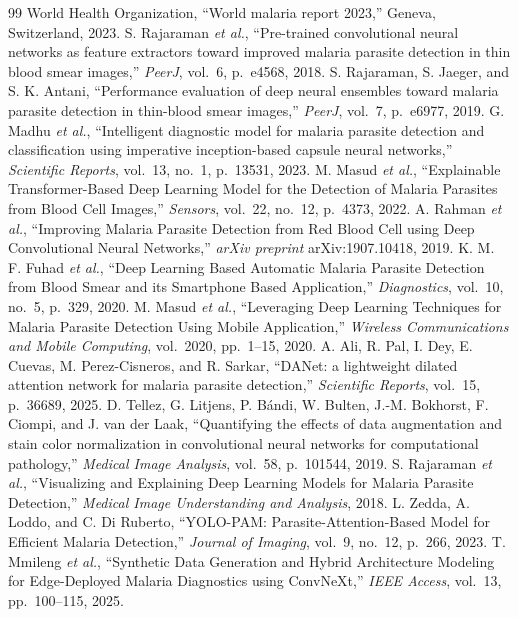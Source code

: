 \documentclass[conference]{IEEEtran}
\begin{document}
\begin{thebibliography}{99}
 World Health Organization, ``World malaria report 2023,'' Geneva,
Switzerland, 2023.
 S. Rajaraman \emph{et al.}, ``Pre-trained convolutional
neural networks as feature extractors toward improved malaria parasite detection in
thin blood smear images,'' \emph{PeerJ}, vol.~6, p.~e4568, 2018.
 S. Rajaraman, S. Jaeger, and S. K. Antani, ``Performance
evaluation of deep neural ensembles toward malaria parasite detection in thin-blood
smear images,'' \emph{PeerJ}, vol.~7, p.~e6977, 2019.
 G. Madhu \emph{et al.}, ``Intelligent diagnostic model for malaria
parasite detection and classification using imperative inception-based capsule neural
networks,'' \emph{Scientific Reports}, vol.~13, no.~1, p.~13531, 2023.
 M. Masud \emph{et al.}, ``Explainable Transformer-Based Deep
Learning Model for the Detection of Malaria Parasites from Blood Cell Images,''
\emph{Sensors}, vol.~22, no.~12, p.~4373, 2022.
 A. Rahman \emph{et al.}, ``Improving Malaria Parasite Detection
from Red Blood Cell using Deep Convolutional Neural Networks,'' \emph{arXiv preprint}
arXiv:1907.10418, 2019.
 K. M. F. Fuhad \emph{et al.}, ``Deep Learning Based Automatic
Malaria Parasite Detection from Blood Smear and its Smartphone Based Application,''
\emph{Diagnostics}, vol.~10, no.~5, p.~329, 2020.
 M. Masud \emph{et al.}, ``Leveraging Deep Learning Techniques for
Malaria Parasite Detection Using Mobile Application,'' \emph{Wireless Communications
and Mobile Computing}, vol.~2020, pp.~1--15, 2020.
 A. Ali, R. Pal, I. Dey, E. Cuevas, M. Perez-Cisneros, and
R. Sarkar, ``DANet: a lightweight dilated attention network for malaria parasite
detection,'' \emph{Scientific Reports}, vol.~15, p.~36689, 2025.
 D. Tellez, G. Litjens, P. B\'andi, W. Bulten, J.-M. Bokhorst,
F. Ciompi, and J. van der Laak, ``Quantifying the effects of data augmentation and
stain color normalization in convolutional neural networks for computational
pathology,'' \emph{Medical Image Analysis}, vol.~58, p.~101544, 2019.
 S. Rajaraman \emph{et al.}, ``Visualizing and Explaining
Deep Learning Models for Malaria Parasite Detection,'' \emph{Medical Image
Understanding and Analysis}, 2018.
 L. Zedda, A. Loddo, and C. Di Ruberto, ``YOLO-PAM:
Parasite-Attention-Based Model for Efficient Malaria Detection,'' \emph{Journal of
Imaging}, vol.~9, no.~12, p.~266, 2023.
 T. Mmileng \emph{et al.}, ``Synthetic Data Generation and Hybrid
Architecture Modeling for Edge-Deployed Malaria Diagnostics using ConvNeXt,''
\emph{IEEE Access}, vol.~13, pp.~100--115, 2025.
\end{thebibliography}
\end{document}
